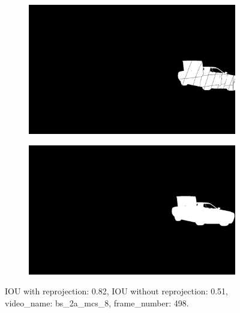 \begin{figure}
\begin{subfigure}[t]{0.19\textwidth}
\end{subfigure}
\begin{subfigure}[t]{0.19\textwidth}
\centering
\includegraphics[scale=0.07]{good_examples/visual_29224_w_np.png}
\end{subfigure}
\begin{subfigure}[t]{0.19\textwidth}
\centering
\includegraphics[scale=0.07]{good_examples/visual_29224_wo_np.png}
\end{subfigure}
\caption{IOU with reprojection: 0.82, IOU without reprojection: 0.51, video\_name: bs\_2a\_mcs\_8, frame\_number: 498.}
\end{figure}

